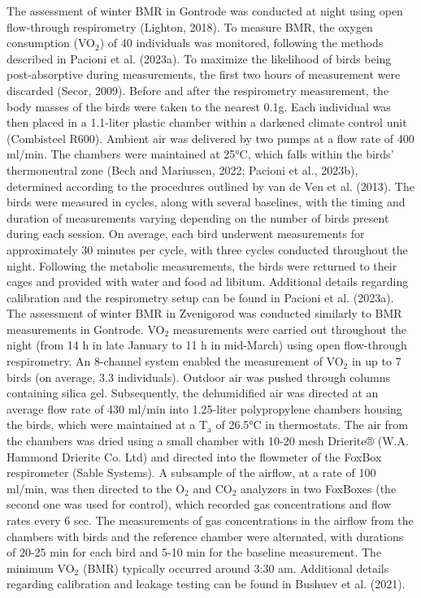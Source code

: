 \documentclass[10pt, twoside]{book} %
\begin{document}
The assessment of winter BMR in Gontrode was conducted at night using open flow-through respirometry (Lighton, 2018). To measure BMR, the oxygen consumption (VO$_{\text{2}}$) of 40 individuals was monitored, following the methods described in Pacioni et al. (2023a). To maximize the likelihood of birds being post-absorptive during measurements, the first two hours of measurement were discarded (Secor, 2009). Before and after the respirometry measurement, the body masses of the birds were taken to the nearest 0.1g. Each individual was then placed in a 1.1-liter plastic chamber within a darkened climate control unit (Combisteel R600). Ambient air was delivered by two pumps at a flow rate of 400 ml/min. The chambers were maintained at 25°C, which falls within the birds' thermoneutral zone (Bech and Mariussen, 2022; Pacioni et al., 2023b), determined according to the procedures outlined by van de Ven et al. (2013). The birds were measured in cycles, along with several baselines, with the timing and duration of measurements varying depending on the number of birds present during each session. On average, each bird underwent measurements for approximately 30 minutes per cycle, with three cycles conducted throughout the night. Following the metabolic measurements, the birds were returned to their cages and provided with water and food ad libitum. Additional details regarding calibration and the respirometry setup can be found in Pacioni et al. (2023a). \\

The assessment of winter BMR in Zvenigorod was conducted similarly to BMR measurements in Gontrode. VO$_{\text{2}}$ measurements were carried out throughout the night (from 14 h in late January to 11 h in mid-March) using open flow-through respirometry. An 8-channel system enabled the measurement of VO$_{\text{2}}$ in up to 7 birds (on average, 3.3 individuals). Outdoor air was pushed through columns containing silica gel. Subsequently, the dehumidified air was directed at an average flow rate of 430 ml/min into 1.25-liter polypropylene chambers housing the birds, which were maintained at a T$_{\text{a}}$ of 26.5°C in thermostats. The air from the chambers was dried using a small chamber with 10-20 mesh Drierite® (W.A. Hammond Drierite Co. Ltd) and directed into the flowmeter of the FoxBox respirometer (Sable Systems). A subsample of the airflow, at a rate of 100 ml/min, was then directed to the O$_{\text{2}}$ and CO$_{\text{2}}$ analyzers in two FoxBoxes (the second one was used for control), which recorded gas concentrations and flow rates every 6 sec. The measurements of gas concentrations in the airflow from the chambers with birds and the reference chamber were alternated, with durations of 20-25 min for each bird and 5-10 min for the baseline measurement. The minimum VO$_{\text{2}}$ (BMR) typically occurred around 3:30 am. Additional details regarding calibration and leakage testing can be found in Bushuev et al. (2021).\\
\end{document}
